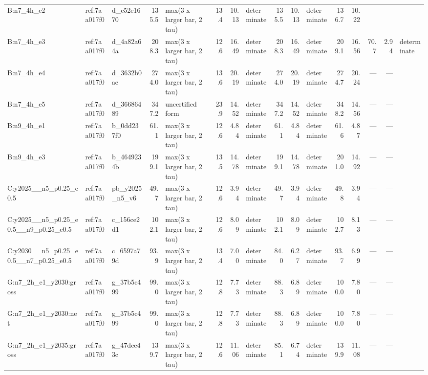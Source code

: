 \begin{table}[htbp]
\begin{tabular}{lllrlrrlrrlrrrrl}
B:n7\_4h\_e2 & ref:7aa017f0 & d\_c52e1670 & 135.5 & max(3 x larger bar, 2 tau) & 13.4 & 10.13 & determinate & 135.5 & 10.13 & determinate & 136.7 & 10.22 & --- & --- &  \\
B:n7\_4h\_e3 & ref:7aa017f0 & d\_4a82a64a & 208.3 & max(3 x larger bar, 2 tau) & 12.6 & 16.49 & determinate & 208.3 & 16.49 & determinate & 209.1 & 16.56 & 70.7 & 2.94 & determinate \\
B:n7\_4h\_e4 & ref:7aa017f0 & d\_3632b0ae & 274.0 & max(3 x larger bar, 2 tau) & 13.6 & 20.19 & determinate & 274.0 & 20.19 & determinate & 274.7 & 20.24 & --- & --- &  \\
B:n7\_4h\_e5 & ref:7aa017f0 & d\_36686489 & 347.2 & uncertified form & 23.9 & 14.52 & determinate & 347.2 & 14.52 & determinate & 348.2 & 14.56 & --- & --- &  \\
B:n9\_4h\_e1 & ref:7aa017f0 & b\_0dd237f0 & 61.1 & max(3 x larger bar, 2 tau) & 12.6 & 4.84 & determinate & 61.1 & 4.84 & determinate & 61.6 & 4.87 & --- & --- &  \\
B:n9\_4h\_e3 & ref:7aa017f0 & b\_4649234b & 199.1 & max(3 x larger bar, 2 tau) & 13.5 & 14.78 & determinate & 199.1 & 14.78 & determinate & 201.0 & 14.92 & --- & --- &  \\
C:y2025\_\_n5\_p0.25\_e0.5 & ref:7aa017f0 & pb\_y2025\_n5\_v6 & 49.7 & max(3 x larger bar, 2 tau) & 12.6 & 3.94 & determinate & 49.7 & 3.94 & determinate & 49.8 & 3.94 & --- & --- &  \\
C:y2025\_\_n5\_p0.25\_e0.5\_\_n9\_p0.25\_e0.5 & ref:7aa017f0 & c\_156ce2d1 & 102.1 & max(3 x larger bar, 2 tau) & 12.6 & 8.09 & determinate & 102.1 & 8.09 & determinate & 102.7 & 8.13 & --- & --- &  \\
C:y2030\_\_n5\_p0.25\_e0.5\_\_n7\_p0.25\_e0.5 & ref:7aa017f0 & c\_6597a79d & 93.9 & max(3 x larger bar, 2 tau) & 13.4 & 7.00 & determinate & 84.0 & 6.27 & determinate & 93.7 & 6.99 & --- & --- &  \\
G:n7\_2h\_e1\_y2030:gross & ref:7aa017f0 & g\_37b5c499 & 99.0 & max(3 x larger bar, 2 tau) & 12.8 & 7.73 & determinate & 88.3 & 6.89 & determinate & 100.0 & 7.80 & --- & --- &  \\
G:n7\_2h\_e1\_y2030:net & ref:7aa017f0 & g\_37b5c499 & 99.0 & max(3 x larger bar, 2 tau) & 12.8 & 7.73 & determinate & 88.3 & 6.89 & determinate & 100.0 & 7.80 & --- & --- &  \\
G:n7\_2h\_e1\_y2035:gross & ref:7aa017f0 & g\_47dce43c & 139.7 & max(3 x larger bar, 2 tau) & 12.6 & 11.06 & determinate & 85.1 & 6.74 & determinate & 139.9 & 11.08 & --- & --- &  \\

\end{tabular}
\end{table}
